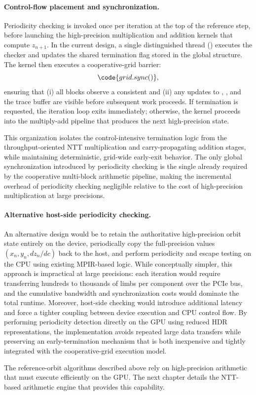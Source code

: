 \paragraph{Control-flow placement and synchronization.}
Periodicity checking is invoked once per iteration at the top of the reference
step, before launching the high-precision multiplication and addition kernels
that compute \(z_{n+1}\). In the current design, a single distinguished thread
() executes the checker and updates the shared
termination flag stored in the global  structure. The kernel
then executes a cooperative-grid barrier:
\begin{equation}
  \code{grid.sync()},
  \label{eq:grid-sync}
\end{equation}
ensuring that (i) all blocks observe a consistent  and
(ii) any updates to , , and the trace buffer are
visible before subsequent work proceeds. If termination is requested, the
iteration loop exits immediately; otherwise, the kernel proceeds into the
multiply-add pipeline that produces the next high-precision state.

This organization isolates the control-intensive termination logic from the
throughput-oriented NTT multiplication and carry-propagating addition stages,
while maintaining deterministic, grid-wide early-exit behavior. The only global
synchronization introduced by periodicity checking is the single 
already required by the cooperative multi-block arithmetic pipeline, making the
incremental overhead of periodicity checking negligible relative to the cost of
high-precision multiplication at large precisions.

\paragraph{Alternative host-side periodicity checking.}
An alternative design would be to retain the authoritative high-precision orbit
state entirely on the device, periodically copy the full-precision values
\((x_n, y_n, dz_n/dc)\) back to the host, and perform periodicity and escape
testing on the CPU using existing MPIR-based logic. While conceptually simpler,
this approach is impractical at large precisions: each iteration would require
transferring hundreds to thousands of limbs per component over the PCIe bus,
and the cumulative bandwidth and synchronization costs would dominate the total
runtime. Moreover, host-side checking would introduce additional latency and
force a tighter coupling between device execution and CPU control flow. By
performing periodicity detection directly on the GPU using reduced HDR
representations, the implementation avoids repeated large data transfers while
preserving an early-termination mechanism that is both inexpensive and tightly
integrated with the cooperative-grid execution model.

The reference-orbit algorithms described above rely on high-precision arithmetic
that must execute efficiently on the GPU.  The next chapter details the
NTT-based arithmetic engine that provides this capability.

